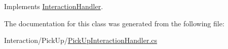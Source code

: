 Implements \mbox{\hyperlink{class_interaction_handler_ae240fb919621a4e6d5e3dc6130c809d0}{Interaction\+Handler}}.



The documentation for this class was generated from the following file\+:\begin{DoxyCompactItemize}
\item 
Interaction/\+Pick\+Up/\mbox{\hyperlink{_pick_up_interaction_handler_8cs}{Pick\+Up\+Interaction\+Handler.\+cs}}\end{DoxyCompactItemize}
